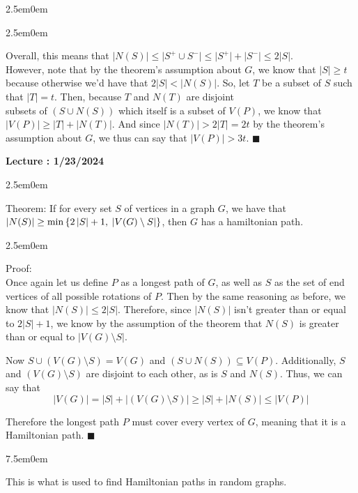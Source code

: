 \documentclass{book}
\newcommand{\hTwo}{%
   \color{MidnightBlue}%
   \fontsize{13}{15}\selectfont%
}
\newcommand{\hThree}{%
   \color{PineGreen}
   \fontsize{13}{15}\selectfont%
}
\newcommand{\teachComment}{
   \color{Orange}%
   \fontsize{12}{14}\selectfont%
}
\newenvironment{myIndent}{%
   \begin{adjustwidth}{2.5em}{0em}%
}{%
   \end{adjustwidth}%
}
\newenvironment{myTindent}{%
   \begin{adjustwidth}{7.5em}{0em}%
}{%
   \end{adjustwidth}%
}
\newcommand{\uuline}[2][.]{%
{\vphantom{a}\color{#1}%
\rlap{\rule[-0.18em]{\widthof{#2}}{0.06em}}%
\rlap{\rule[-0.32em]{\widthof{#2}}{0.06em}}}%
#2}
\newcounter{LectureNumber}
\newcommand*{\markLecture}[1]{%
   \stepcounter{LectureNumber}%
   {\huge \color{Black} \textbf{Lecture \theLectureNumber: #1} \newline}%
}
\newcommand{\retTwo}{\hfill\bigbreak}
\begin{document}
{\begin{myIndent}
{\begin{myIndent}
      Overall, this means that $\lvert N(S) \rvert \leq \lvert S^+ \cup S^- \rvert \leq \lvert S^+ \rvert + \lvert S^- \rvert \leq 2 \lvert S \rvert$.\\ However, note that by the theorem's assumption about $G$, we know that $\left|S\right| \geq t$ because otherwise we'd have that $ 2\left| S \right| < \left|N(S)\right|$. So, let $T$ be a subset of $S$ such that $\left| T \right| = t$. Then, because $T$ and $N(T)$ are disjoint\\ subsets of $(S \cup N(S))$ which itself is a subset of $V(P)$, we know that\\ $\left| V(P) \right| \geq \left| T \right| + \left| N(T) \right|$. And since $\left| N(T) \right| > 2\left| T \right| = 2t$ by the theorem's assumption about $G$, we thus can say that $\left| V(P) \right| > 3t$. $\blacksquare$ \retTwo
   \end{myIndent}}
\end{myIndent}}

\markLecture{1/23/2024}

{\begin{myIndent} \hTwo
   \uuline{Theorem}: If for every set $S$ of vertices in a graph $G$, we have that\\ $\left| N(S) \right| \geq \min{\{2\left|S\right| + 1, \hspace{0.25em} \left|V(G) \setminus S \right|\}}$, then $G$ has a hamiltonian path. \retTwo

   {\begin{myIndent} \hThree
      Proof:\\ Once again let us define $P$ as a longest path of $G$, as well as $S$ as the set of end vertices of all possible rotations of $P$. Then by the same reasoning as before, we know that $\left| N(S) \right| \leq 2 \left| S \right|$. Therefore, since $\left| N(S) \right|$ isn't greater than or equal to $2 \left| S \right| + 1$, we know by the assumption of the theorem that $N(S)$ is greater than or equal to $\left|V(G) \setminus S \right|$. \retTwo

      Now $S \cup (V(G) \setminus S) = V(G)$ and $(S \cup N(S)) \subseteq V(P)$. Additionally, $S$ and $(V(G) \setminus S)$ are disjoint to each other, as is $S$ and $N(S)$. Thus, we can say that \[
         \left| V(G) \right| = \left| S \right| + \left| (V(G) \setminus S) \right| \geq \left| S \right| + \left| N(S) \right| \leq \left| V(P) \right| \]
      
      Therefore the longest path $P$ must cover every vertex of $G$, meaning that it is a Hamiltonian path. $\blacksquare$\retTwo
      {\begin{myTindent} \teachComment
         This is what is used to find Hamiltonian paths in random graphs.
      \end{myTindent}}
   \end{myIndent}}
\end{myIndent}}
\end{document}
